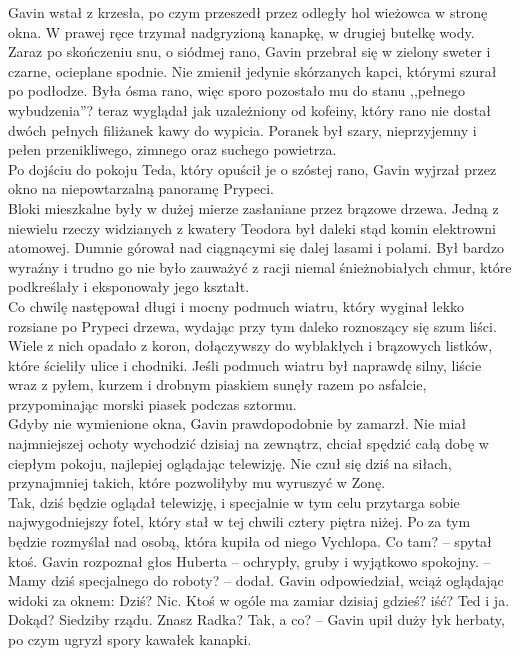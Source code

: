 \documentclass[../MAIN.tex]{subfiles}
\begin{document}
Gavin wstał z krzesła, po czym przeszedł przez odległy hol wieżowca w stronę okna. W prawej ręce trzymał nadgryzioną kanapkę, w drugiej butelkę wody.\\
Zaraz po skończeniu snu, o siódmej rano, Gavin przebrał się w zielony sweter i czarne, ocieplane spodnie. Nie zmienił jedynie skórzanych kapci, którymi szurał po podłodze. Była ósma rano, więc sporo pozostało mu do stanu ,,pełnego wybudzenia''? teraz wyglądał jak uzależniony od kofeiny, który rano nie dostał dwóch pełnych filiżanek kawy do wypicia. Poranek był szary, nieprzyjemny i pełen przenikliwego, zimnego oraz suchego powietrza.\\
Po dojściu do pokoju Teda, który opuścił je o szóstej rano, Gavin wyjrzał przez okno na niepowtarzalną panoramę Prypeci.\\
Bloki mieszkalne były w dużej mierze zasłaniane przez brązowe drzewa. Jedną z niewielu rzeczy widzianych z kwatery Teodora był daleki stąd komin elektrowni atomowej. Dumnie górował nad ciągnącymi się dalej lasami i polami. Był bardzo wyraźny i trudno go nie było zauważyć z racji niemal śnieżnobiałych chmur, które podkreślały i eksponowały jego kształt.\\
Co chwilę następował długi i mocny podmuch wiatru, który wyginał lekko rozsiane po Prypeci drzewa, wydając przy tym daleko roznoszący się szum liści. Wiele z nich opadało z koron, dołączywszy do wyblakłych i brązowych listków, które ścieliły ulice i chodniki. Jeśli podmuch wiatru był naprawdę silny, liście wraz z pyłem, kurzem i drobnym piaskiem sunęły razem po asfalcie, przypominając morski piasek podczas sztormu.\\
Gdyby nie wymienione okna, Gavin prawdopodobnie by zamarzł. Nie miał najmniejszej ochoty wychodzić dzisiaj na zewnątrz, chciał spędzić całą dobę w ciepłym pokoju, najlepiej oglądając telewizję. Nie czuł się dziś na siłach, przynajmniej takich, które pozwoliłyby mu wyruszyć w Zonę.\\
Tak, dziś będzie oglądał telewizję, i specjalnie w tym celu przytarga sobie najwygodniejszy fotel, który stał w tej chwili cztery piętra niżej. Po za tym będzie rozmyślał nad osobą, która kupiła od niego Vychlopa.
\sx Co tam? -- spytał ktoś. Gavin rozpoznał głos Huberta -- ochrypły, gruby i wyjątkowo spokojny. -- Mamy dziś specjalnego do roboty? -- dodał.
\qd
Gavin odpowiedział, wciąż oglądając widoki za oknem:
\sx Dziś? Nic. Ktoś w ogóle ma zamiar dzisiaj gdzieś? iść?
\xx Ted i ja.
\xx Dokąd?
\xx Siedziby rządu. Znasz Radka?
\xx Tak, a co? -- Gavin upił duży łyk herbaty, po czym ugryzł spory kawałek kanapki.
\end{document}
